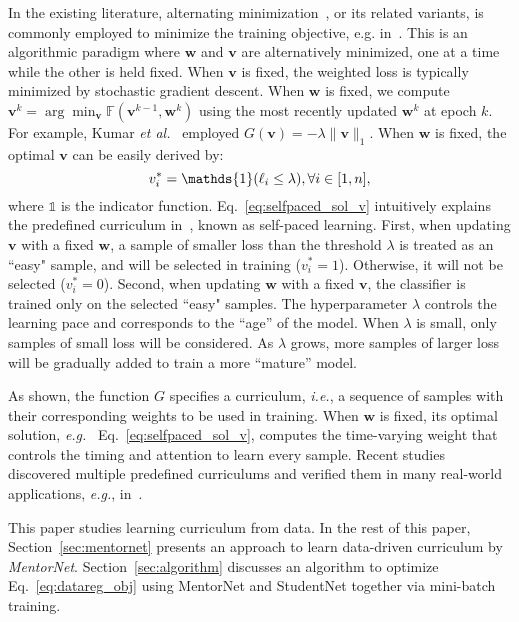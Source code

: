 \documentclass{article}
\newcommand{\eg}{\emph{e.g.}} \newcommand{\Eg}{\emph{E.g}}
\newcommand{\ie}{\emph{i.e.}} \newcommand{\Ie}{\emph{I.e}}
\newcommand{\etal}{\emph{et al.}}
\begin{document}
In the existing literature, alternating minimization~\cite{csiszar1984information}, or its related variants, is commonly employed to minimize the training objective, e.g. in~\cite{kumar2010self,ma2017self,jiang2014self}. This is an algorithmic paradigm where $\mathbf{w}$ and $\mathbf{v}$ are alternatively minimized, one at a time while the other is held fixed. When $\mathbf{v}$ is fixed, the weighted loss is typically minimized by stochastic gradient descent. When $\mathbf{w}$ is fixed, we compute $\mathbf{v}^{k} = \arg\min_{\mathbf{v}} \mathbb{F} (\mathbf{v}^{k-1}, \mathbf{w}^{k})$ using the most recently updated $\mathbf{w}^{k}$ at epoch $k$. For example, Kumar \etal~ employed $G(\mathbf{v}) = - \lambda \|\mathbf{v}\|_1$. When $\mathbf{w}$ is fixed, the optimal $\mathbf{v}$ can be easily derived by:
\vspace{-2mm}
\begin{equation}
\label{eq:selfpaced_sol_v}
v_i^* = \mathds{1}(\ell_i \le \lambda), \forall i \in [1,n],
\vspace{-2mm}
\end{equation}
where $\mathds{1}$ is the indicator function. Eq.~\eqref{eq:selfpaced_sol_v} intuitively explains the predefined curriculum in~\cite{kumar2010self}, known as self-paced learning. First, when updating $\mathbf{v}$ with a fixed $\mathbf{w}$, a sample of smaller loss than the threshold $\lambda$ is treated as an ``easy" sample, and will be selected in training ($v_i^*=1$). Otherwise, it will not be selected ($v_i^*=0$). Second, when updating $\mathbf{w}$ with a fixed $\mathbf{v}$, the classifier is trained only on the selected ``easy" samples. The hyperparameter $\lambda$ controls the learning pace and corresponds to the ``age'' of the model. When $\lambda$ is small, only samples of small loss will be considered. As $\lambda$ grows, more samples of larger loss will be gradually added to train a more ``mature'' model.

As shown, the function $G$ specifies a curriculum, \ie, a sequence of samples with their corresponding weights to be used in training. When $\mathbf{w}$ is fixed, its optimal solution, \eg~ Eq.~\eqref{eq:selfpaced_sol_v}, computes the time-varying weight that controls the timing and attention to learn every sample. Recent studies discovered multiple predefined curriculums and verified them in many real-world applications, \eg, in~\cite{fan2017self,ma2017self,sangineto2016self,fan2017self,chang2017active}.

This paper studies learning curriculum from data. In the rest of this paper, Section~\ref{sec:mentornet} presents an approach to learn data-driven curriculum by \emph{MentorNet}. Section~\ref{sec:algorithm} discusses an algorithm to optimize Eq.~\eqref{eq:datareg_obj} using MentorNet and StudentNet together via mini-batch training.
\end{document}
